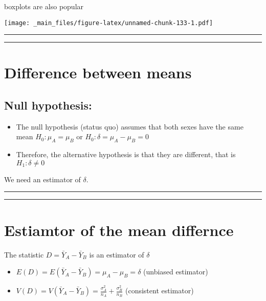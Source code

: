 \documentclass[
]{book}
\begin{document}
boxplots are also popular

\texttt{[image: \_main\_files/figure-latex/unnamed-chunk-133-1.pdf]}

\begin{center}\rule{0.5\linewidth}{0.5pt}\end{center}

\begin{center}\rule{0.5\linewidth}{0.5pt}\end{center}

\hypertarget{difference-between-means-4}{%
\section{Difference between means}\label{difference-between-means-4}}

\hypertarget{null-hypothesis-4}{%
\subsection{Null hypothesis:}\label{null-hypothesis-4}}

\begin{itemize}
\item
  The null hypothesis (status quo) assumes that both sexes have the same mean \(H_0: \mu_A=\mu_B\) or \(H_0: \delta=\mu_A-\mu_B=0\)
\item
  Therefore, the alternative hypothesis is that they are different, that is \(H_1: \delta \neq 0\)
\end{itemize}

We need an estimator of \(\delta\).

\begin{center}\rule{0.5\linewidth}{0.5pt}\end{center}

\begin{center}\rule{0.5\linewidth}{0.5pt}\end{center}

\hypertarget{estiamtor-of-the-mean-differnce}{%
\section{Estiamtor of the mean differnce}\label{estiamtor-of-the-mean-differnce}}

The statistic \(D=\bar{Y}_A-\bar{Y}_B\) is an estimator of \(\delta\)

\begin{itemize}
\item
  \(E(D)=E(\bar{Y}_A-\bar{Y}_B)=\mu_A-\mu_B=\delta\) (unbiased estimator)
\item
  \(V(D)=V(\bar{Y}_A-\bar{Y}_B)=\frac{\sigma^2_A}{n_A}+\frac{\sigma^2_B}{n_B}\) (consistent estimator)
\end{itemize}
\end{document}
